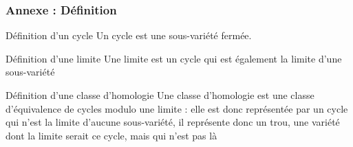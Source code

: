 \documentclass{beamer}
\begin{document}
\appendix

\begin{frame}
    \frametitle{Annexe : Définition}
    \begin{block}{Définition d'un cycle}
        Un cycle est une sous-variété fermée.
    \end{block}
    \begin{block}{Définition d'une limite}
        Une limite est un cycle qui est également la limite d'une
        sous-variété 
    \end{block}
    \begin{block}{Définition d'une classe d'homologie}
        Une classe d'homologie est une classe d'équivalence de 
        cycles modulo une limite : elle est donc représentée par un
        cycle qui n'est la limite d'aucune sous-variété, il représente 
        donc un trou, une variété dont la limite serait ce cycle, mais qui n'est pas là
    \end{block}
\end{frame}
\end{document}

